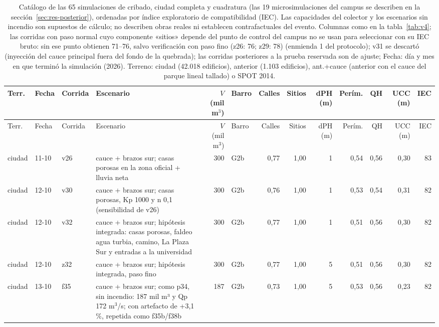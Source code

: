{\scriptsize\setlength{\tabcolsep}{2.5pt}
\begin{longtable}{lll>{\raggedright\arraybackslash}p{3.3cm}rlrrrrrrr}
\caption{Catálogo de las 65 simulaciones de cribado, ciudad completa y cuadratura (las 19 microsimulaciones del campus se describen en la sección~\ref{sec:res-posterior}), ordenadas por índice exploratorio de compatibilidad (IEC). Las capacidades del colector y los escenarios sin incendio son supuestos de cálculo; no describen obras reales ni establecen contrafactuales del evento. Columnas como en la tabla~\ref{tab:v4}; las corridas con paso normal cuyo componente «sitios» depende del punto de control del campus no se usan para seleccionar con su IEC bruto: sin ese punto obtienen 71--76, salvo verificación con paso fino (z26: 76; z29: 78) (enmienda 1 del protocolo); v31 se descartó (inyección del cauce principal fuera del fondo de la quebrada); las corridas posteriores a la prueba reservada son de ajuste; Fecha: día y mes en que terminó la simulación (2026). Terreno: ciudad (42.018 edificios), anterior (1.103 edificios), ant.+cauce (anterior con el cauce del parque lineal tallado) o SPOT 2014.}\label{tab:catalogo}\\\toprule
Terr. & Fecha & Corrida & Escenario & $V$ (mil m$^3$) & Barro & Calles & Sitios & dPH (m) & Perím. & QH & UCC (m) & IEC\\\midrule\endfirsthead
\toprule Terr. & Fecha & Corrida & Escenario & $V$ (mil m$^3$) & Barro & Calles & Sitios & dPH (m) & Perím. & QH & UCC (m) & IEC\\\midrule\endhead
ciudad & 11-10 & v26 & cauce + brazos sur; casas porosas en la zona oficial + lluvia neta & 300 & G2b & 0{,}77 & 1{,}00 & 1 & 0{,}54 & 0{,}56 & 0{,}30 & 83\\
ciudad & 12-10 & v30 & cauce + brazos sur; casas porosas, Kp 1000 y n 0,1 (sensibilidad de v26) & 300 & G2b & 0{,}76 & 1{,}00 & 1 & 0{,}53 & 0{,}54 & 0{,}31 & 82\\
ciudad & 12-10 & v32 & cauce + brazos sur; hipótesis integrada: casas porosas, faldeo agua turbia, camino, La Plaza Sur y entradas a la universidad & 300 & G2b & 0{,}77 & 1{,}00 & 1 & 0{,}51 & 0{,}56 & 0{,}30 & 82\\
ciudad & 12-10 & z32 & cauce + brazos sur; hipótesis integrada, paso fino & 300 & G2b & 0{,}77 & 1{,}00 & 5 & 0{,}51 & 0{,}56 & 0{,}30 & 82\\
ciudad & 13-10 & f35 & cauce + brazos sur; como p34, sin incendio: 187 mil m³ y Qp 172 m$^3$/s; con artefacto de +3,1 \%, repetida como f35b/f38b & 187 & G2b & 0{,}73 & 1{,}00 & 5 & 0{,}53 & 0{,}56 & 0{,}23 & 82\\

\end{longtable}}
